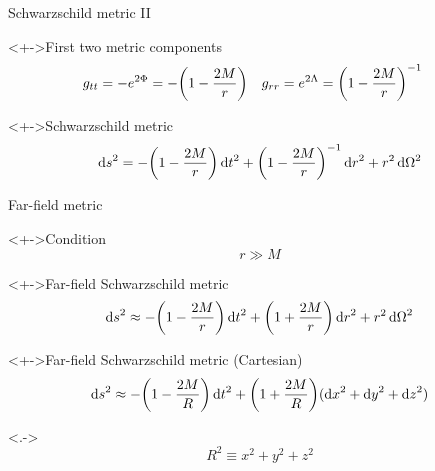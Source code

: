 \documentclass{beamer}
\let\svthefootnote\thefootnote
\newcommand\blankfootnote[1]{%
  \let\thefootnote\relax\footnotetext{#1}%
  \let\thefootnote\svthefootnote%
}
\begin{document}
\begin{frame}{Schwarzschild metric II}

\begin{block}<+->{First two metric components}
\begin{align*}
  g_{tt} &= -e^{2\Phi} = -\qty(1 - \frac{2M}{r})
  &
  g_{rr} &= e^{2\Lambda} = \qty(1 - \frac{2M}{r})^{-1}
\end{align*}
\end{block}

\begin{block}<+->{Schwarzschild metric}
\begin{displaymath}
  \dd{s}^2 =
 -\qty(1 - \frac{2M}{r}) \dd{t}^2 +
  \qty(1 - \frac{2M}{r})^{-1} \dd{r}^2 +
  r^2 \dd{\Omega}^2
\end{displaymath}
\end{block}

\blankfootnote{\textcite[pp. 258, 262--263]{Schutz}}

\end{frame}


\begin{frame}{Far-field metric}

\begin{block}<+->{Condition}
\begin{displaymath}
  r \gg M
\end{displaymath}
\end{block}

\begin{block}<+->{Far-field Schwarzschild metric}
\begin{displaymath}
  \dd{s}^2 \approx
 -\qty(1 - \frac{2M}{r}) \dd{t}^2 +
  \qty(1 + \frac{2M}{r}) \dd{r}^2 +
  r^2 \dd{\Omega}^2
\end{displaymath}
\end{block}

\begin{block}<+->{Far-field Schwarzschild metric (Cartesian)}
\begin{displaymath}
  \dd{s}^2 \approx
 -\qty(1 - \frac{2M}{R}) \dd{t}^2 +
  \qty(1 + \frac{2M}{R}) (\dd{x}^2 + \dd{y}^2 + \dd{z}^2)
\end{displaymath}
\end{block}

\onslide<.->{
\begin{displaymath}
  R^2 \equiv x^2 + y^2 + z^2
\end{displaymath}
}

\blankfootnote{\textcite[pp. 263]{Schutz}}



\end{frame}
\end{document}
